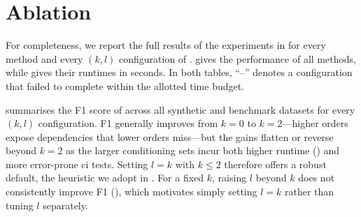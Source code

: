 \begin{table}[h]
  \centering
  \caption{Minimal d-separator sizes restricted to the true Markov
    blanket, computed using every variable of each benchmark network as
    a target. ``Targets'' is the number of targets (all variables) and
    ``Pairs'' the number of target--non-blanket pairs; ``Mean sep.\ size''
    and ``Max'' are the mean and maximum separator size; and
    ``Cover $\leq 3$'' is the fraction whose minimal separator has size
    at most three.}
  \label{tab:dsep}
  \resizebox{\columnwidth}{!}{}
\end{table}

\section{Ablation}\label{apx:ablation}
For completeness, we report the full results of the experiments in
 for every method and every $(k,l)$ configuration of
{\method}.  gives the performance of all methods,
while  gives their runtimes in seconds. In both
tables, ``--'' denotes a configuration that failed to complete within the
allotted time budget.

 summarises the F1 score of {\method} across all
synthetic and benchmark datasets for every $(k,l)$ configuration. F1
generally improves from $k=0$ to $k=2$---higher orders expose
dependencies that lower orders miss---but the gains flatten or reverse
beyond $k=2$ as the larger conditioning sets incur both higher runtime
() and more error-prone \gls{ci} tests. Setting
$l=k$ with $k\leq 2$ therefore offers a robust default, the heuristic we
adopt in . For a fixed $k$, raising $l$ beyond $k$
does not consistently improve F1 (), which
motivates simply setting $l=k$ rather than tuning $l$ separately.

\begin{table}[h]
  \centering
  \caption{F1 score across datasets for each $(k,l)$ configuration of {\method}.}
  \label{tab:kl-ablation}
  
\end{table}

\begin{table}[h]
  \centering
  \caption{Full results on benchmark datasets.}
  \label{tab:real-full}
  
\end{table}

\begin{table}[h]
  \centering
  \caption{Full runtimes (in seconds) on benchmark datasets.}
  \label{tab:runtime-full}
  
\end{table}
